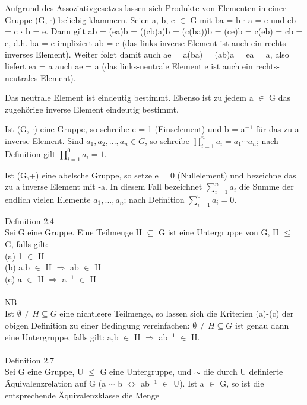 \begin{compactitem}
\item Aufgrund des Assoziativgesetzes lassen sich Produkte von Elementen in einer Gruppe (G, $\cdot$) beliebig klammern. Seien a, b, c $\in$ G mit ba = b $\cdot$ a = e und cb = c $\cdot$ b = e. Dann gilt 
ab = (ea)b = ((cb)a)b = (c(ba))b = (ce)b = c(eb) = cb = e, d.h. ba = e impliziert ab = e (das links-inverse Element ist auch ein rechts-inverses Element). Weiter folgt damit auch ae = a(ba) = (ab)a = ea = a, also liefert ea = a auch ae = a (das links-neutrale Element e ist auch ein rechts-neutrales Element).
\item Das neutrale Element ist eindeutig bestimmt. Ebenso ist zu jedem a $\in$ G das zugehörige inverse Element eindeutig bestimmt.
\item Ist (G, $\cdot$) eine Gruppe, so schreibe e = 1 (Einselement) und b = a$^{-1}$ für das zu a inverse Element. Sind $a_1, a_2, . . . , a_n \in G$, so schreibe $\prod\nolimits_{i=1}^{n} a_i = a_1 \cdots a_n$; nach Definition gilt $\prod\nolimits_{i=1}^{0}a_i = 1$.
\item Ist (G,+) eine abelsche Gruppe, so setze e = 0 (Nullelement) und bezeichne das zu a inverse Element mit -a. In diesem Fall bezeichnet $\sum\nolimits_{i=1}^{n} a_i$ die Summe der endlich vielen Elemente $a_1, . . . , a_n$; nach Definition $\sum\nolimits_{i=1}^{0} a_i = 0$. \\
\end{compactitem}
Definition 2.4\\
Sei G eine Gruppe. Eine Teilmenge H $\subseteq$ G ist eine Untergruppe von G, H $\le$ G, falls gilt:\\
(a) 1 $\in$ H\\ 
(b) a,b $\in$ H $\Rightarrow$ ab $\in$ H\\ 
(c) a $\in$ H $\Rightarrow$ a$^{-1}$ $\in$ H\\ 
\\
\newpage
NB\\
Ist $\emptyset \neq H \subseteq G$ eine nichtleere Teilmenge, so lassen sich die Kriterien (a)-(c) der obigen Definition zu einer Bedingung vereinfachen: 
$\emptyset \neq H \subseteq G$ ist genau dann eine Untergruppe, falls gilt: a,b $\in$ H $\Rightarrow$ ab$^{-1}$ $\in$ H.\\
\\
Definition 2.7\\
Sei G eine Gruppe, U $\le$ G eine Untergruppe, und $\sim$ die durch U definierte Äquivalenzrelation auf G (a $\sim$ b $\Leftrightarrow$ ab$^{-1}$ $\in$ U). Ist a $\in$ G, so ist die entsprechende Äquivalenzklasse die Menge 
